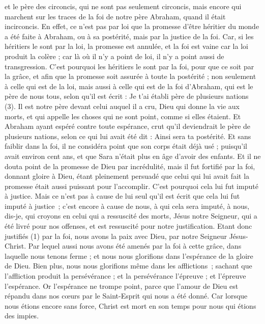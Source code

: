 \begin{multicols}{2}
et le père des circoncis, qui ne sont pas seulement circoncis, mais encore qui marchent sur les traces de la foi de notre père Abraham, quand il était incirconcis.
En effet, ce n’est pas par loi que la promesse d'être héritier du monde a été faite à Abraham, ou à sa postérité, mais par la justice de la foi.
Car, si les héritiers le sont par la loi, la promesse est annulée, et la foi est vaine
car la loi produit la colère ; car là où il n'y a point de loi, il n'y a point aussi de transgression.
C'est pourquoi les héritiers le sont par la foi, pour que ce soit par la grâce, et afin que la promesse soit assurée à toute la postérité ; non seulement à celle qui est de la loi, mais aussi à celle qui est de la foi d'Abraham, qui est le père de nous tous,
selon qu'il est écrit : Je t'ai établi père de plusieurs nations (3). Il est notre père devant celui auquel il a cru, Dieu qui donne la vie aux morts, et qui appelle les choses qui ne sont point, comme si elles étaient.
Et Abraham ayant espéré contre toute espérance, crut qu'il deviendrait le père de plusieurs nations, selon ce qui lui avait été dit : Ainsi sera ta postérité.
Et sans faiblir dans la foi, il ne considéra point que son corps était déjà usé ; puisqu’il avait environ cent ans, et que Sara n’était plus en âge d'avoir des enfants.
Et il ne douta point de la promesse de Dieu par incrédulité, mais il fut fortifié par la foi, donnant gloire à Dieu,
étant pleinement persuadé que celui qui lui avait fait la promesse était aussi puissant pour l'accomplir.
C'est pourquoi cela lui fut imputé à justice.
Mais ce n’est pas à cause de lui seul qu’il est écrit que cela lui fut imputé à justice ;
c’est encore à cause de nous, à qui cela sera imputé, à nous, dis-je, qui croyons en celui qui a ressuscité des morts, Jésus notre Seigneur,
qui a été livré pour nos offenses, et est ressuscité pour notre justification.
\VerseOne{}Etant donc justifiés (1) par la foi, nous avons la paix avec Dieu, par notre Seigneur Jésus-Christ.
Par lequel aussi nous avons été amenés par la foi à cette grâce, dans laquelle nous tenons ferme ; et nous nous glorifions dans l'espérance de la gloire de Dieu.
Bien plus, nous nous glorifions même dans les afflictions ; sachant que l'affliction produit la persévérance ;
et la persévérance l'épreuve ; et l'épreuve l'espérance.
Or l'espérance ne trompe point, parce que l'amour de Dieu est répandu dans nos cœurs par le Saint-Esprit qui nous a été donné.
Car lorsque nous étions encore sans force, Christ est mort en son temps pour nous qui étions des impies.

\end{multicols}
